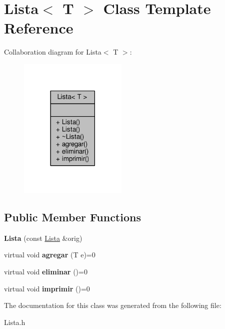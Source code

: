 \hypertarget{class_lista}{\section{Lista$<$ T $>$ Class Template Reference}
\label{class_lista}
}


Collaboration diagram for Lista$<$ T $>$\+:
\nopagebreak
\begin{figure}[H]
\begin{center}
\leavevmode
\includegraphics[width=146pt]{class_lista__coll__graph}
\end{center}
\end{figure}
\subsection*{Public Member Functions}
\begin{DoxyCompactItemize}
\item 
\hypertarget{class_lista_ad63a49df32595e2f321fffd7ffa1346a}{{\bfseries Lista} (const \hyperlink{class_lista}{Lista} \&orig)}\label{class_lista_ad63a49df32595e2f321fffd7ffa1346a}

\item 
\hypertarget{class_lista_aea57814c283f14cd0d31b8da37c622a9}{virtual void {\bfseries agregar} (T e)=0}\label{class_lista_aea57814c283f14cd0d31b8da37c622a9}

\item 
\hypertarget{class_lista_aabdd833f1bc38b8174838f92c5b438b3}{virtual void {\bfseries eliminar} ()=0}\label{class_lista_aabdd833f1bc38b8174838f92c5b438b3}

\item 
\hypertarget{class_lista_af398229330911af031fc1d89a556a840}{virtual void {\bfseries imprimir} ()=0}\label{class_lista_af398229330911af031fc1d89a556a840}

\end{DoxyCompactItemize}


The documentation for this class was generated from the following file\+:\begin{DoxyCompactItemize}
\item 
Lista.\+h\end{DoxyCompactItemize}
